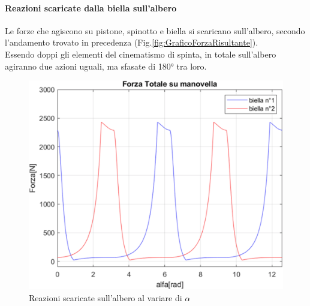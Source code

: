 \paragraph{Reazioni scaricate dalla biella sull'albero}Le forze che agiscono su pistone, spinotto e biella si scaricano sull’albero, secondo l’andamento trovato in precedenza (Fig.\ref{fig:GraficoForzaRisultante}).\\
Essendo doppi gli elementi del cinematismo di spinta, in totale sull’albero agiranno due azioni uguali, ma sfasate di 180° tra loro.\\
\begin{figure}[h]
    \centering
    \includegraphics[scale=0.32]{Immagini/GraficoReazioniScaricateAlbero.png}
    \caption{Reazioni scaricate sull'albero al variare di $\alpha$}
    \label{fig:GraficoReazioniScaricateAlbero}
\end{figure}
